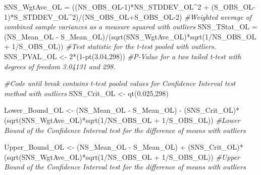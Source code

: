 \documentclass[
]{article}
\newenvironment{Shaded}{\begin{snugshade}}{\end{snugshade}}
\newcommand{\CommentTok}[1]{\textcolor[rgb]{0.56,0.35,0.01}{\textit{#1}}}
\newcommand{\DecValTok}[1]{\textcolor[rgb]{0.00,0.00,0.81}{#1}}
\newcommand{\FloatTok}[1]{\textcolor[rgb]{0.00,0.00,0.81}{#1}}
\newcommand{\FunctionTok}[1]{\textcolor[rgb]{0.00,0.00,0.00}{#1}}
\newcommand{\NormalTok}[1]{#1}
\newcommand{\OtherTok}[1]{\textcolor[rgb]{0.56,0.35,0.01}{#1}}
\newcommand{\SpecialCharTok}[1]{\textcolor[rgb]{0.00,0.00,0.00}{#1}}
\begin{document}
\begin{Shaded}
\begin{Highlighting}[]
\NormalTok{SNS\_WgtAve\_OL }\OtherTok{=}\NormalTok{ ((NS\_OBS\_OL}\DecValTok{{-}1}\NormalTok{)}\SpecialCharTok{*}\NormalTok{NS\_STDDEV\_OL}\SpecialCharTok{\^{}}\DecValTok{2} \SpecialCharTok{+}\NormalTok{ (S\_OBS\_OL}\DecValTok{{-}1}\NormalTok{)}\SpecialCharTok{*}\NormalTok{S\_STDDEV\_OL}\SpecialCharTok{\^{}}\DecValTok{2}\NormalTok{)}\SpecialCharTok{/}\NormalTok{(NS\_OBS\_OL}\SpecialCharTok{+}\NormalTok{S\_OBS\_OL}\DecValTok{{-}2}\NormalTok{) }\CommentTok{\#Weighted average of combined sample variances as a measure squared with outliers}
\NormalTok{SNS\_TStat\_OL }\OtherTok{=}\NormalTok{ (NS\_Mean\_OL }\SpecialCharTok{{-}}\NormalTok{ S\_Mean\_OL)}\SpecialCharTok{/}\NormalTok{(}\FunctionTok{sqrt}\NormalTok{(SNS\_WgtAve\_OL)}\SpecialCharTok{*}\FunctionTok{sqrt}\NormalTok{(}\DecValTok{1}\SpecialCharTok{/}\NormalTok{NS\_OBS\_OL }\SpecialCharTok{+} \DecValTok{1}\SpecialCharTok{/}\NormalTok{S\_OBS\_OL)) }\CommentTok{\#Test statistic for the t{-}test pooled with outliers. }
\NormalTok{SNS\_PVAL\_OL }\OtherTok{\textless{}{-}} \DecValTok{2}\SpecialCharTok{*}\NormalTok{(}\DecValTok{1}\SpecialCharTok{{-}}\FunctionTok{pt}\NormalTok{(}\FloatTok{3.04}\NormalTok{,}\DecValTok{298}\NormalTok{)) }\CommentTok{\#P{-}Value for a two tailed t{-}test with degrees of freedom 3.04131 and 298.  }




\CommentTok{\#Code until break contains t{-}test pooled values for Confidence Interval test method with outliers }
\NormalTok{SNS\_Crit\_OL }\OtherTok{\textless{}{-}} \FunctionTok{qt}\NormalTok{(}\FloatTok{0.025}\NormalTok{,}\DecValTok{298}\NormalTok{)}

\NormalTok{Lower\_Bound\_OL }\OtherTok{\textless{}{-}}\NormalTok{ (NS\_Mean\_OL }\SpecialCharTok{{-}}\NormalTok{ S\_Mean\_OL) }\SpecialCharTok{{-}}\NormalTok{ (SNS\_Crit\_OL)}\SpecialCharTok{*}\NormalTok{(}\FunctionTok{sqrt}\NormalTok{(SNS\_WgtAve\_OL)}\SpecialCharTok{*}\FunctionTok{sqrt}\NormalTok{(}\DecValTok{1}\SpecialCharTok{/}\NormalTok{NS\_OBS\_OL }\SpecialCharTok{+} \DecValTok{1}\SpecialCharTok{/}\NormalTok{S\_OBS\_OL)) }\CommentTok{\#Lower Bound of the Confidence Interval test for the difference of means with outliers}

\NormalTok{Upper\_Bound\_OL }\OtherTok{\textless{}{-}}\NormalTok{ (NS\_Mean\_OL }\SpecialCharTok{{-}}\NormalTok{ S\_Mean\_OL) }\SpecialCharTok{+}\NormalTok{ (SNS\_Crit\_OL)}\SpecialCharTok{*}\NormalTok{(}\FunctionTok{sqrt}\NormalTok{(SNS\_WgtAve\_OL)}\SpecialCharTok{*}\FunctionTok{sqrt}\NormalTok{(}\DecValTok{1}\SpecialCharTok{/}\NormalTok{NS\_OBS\_OL }\SpecialCharTok{+} \DecValTok{1}\SpecialCharTok{/}\NormalTok{S\_OBS\_OL)) }\CommentTok{\#Upper Bound of the Confidence Interval test for the difference of means with outliers}
\end{Highlighting}
\end{Shaded}
\end{document}
